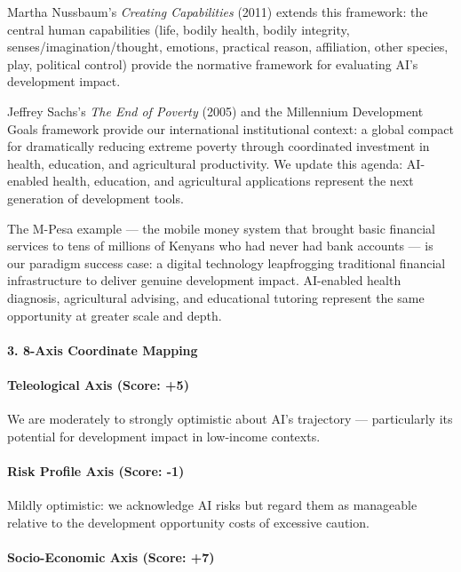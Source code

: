 Martha Nussbaum's \emph{Creating Capabilities} (2011) extends this
framework: the central human capabilities (life, bodily health, bodily
integrity, senses/imagination/thought, emotions, practical reason,
affiliation, other species, play, political control) provide the
normative framework for evaluating AI's development impact.

Jeffrey Sachs's \emph{The End of Poverty} (2005) and the Millennium
Development Goals framework provide our international institutional
context: a global compact for dramatically reducing extreme poverty
through coordinated investment in health, education, and agricultural
productivity. We update this agenda: AI-enabled health, education, and
agricultural applications represent the next generation of development
tools.

The M-Pesa example --- the mobile money system that brought basic
financial services to tens of millions of Kenyans who had never had bank
accounts --- is our paradigm success case: a digital technology
leapfrogging traditional financial infrastructure to deliver genuine
development impact. AI-enabled health diagnosis, agricultural advising,
and educational tutoring represent the same opportunity at greater scale
and depth.

\paragraph{3. 8-Axis Coordinate
Mapping}\label{axis-coordinate-mapping-46}

\paragraph{Teleological Axis (Score:
+5)}\label{teleological-axis-score-5-2}

We are moderately to strongly optimistic about AI's trajectory ---
particularly its potential for development impact in low-income
contexts.

\paragraph{Risk Profile Axis (Score:
-1)}\label{risk-profile-axis-score--1-1}

Mildly optimistic: we acknowledge AI risks but regard them as manageable
relative to the development opportunity costs of excessive caution.

\paragraph{Socio-Economic Axis (Score:
+7)}\label{socio-economic-axis-score-7-2}

